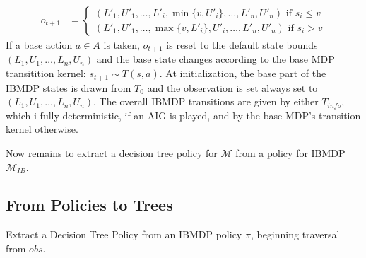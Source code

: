 \begin{definition}
\begin{itemize}
\begin{align*}
    o_{t+1} &= \begin{cases}
        (L'_1, U'_1, \dots , L'_i, \min\{v, U'_i\}, \dots , L'_n, U'_n) \text{ if } s_i \leq v\\
        (L'_1, U'_1, \dots , \max\{v, L'_i\}, U'_i, \dots , L'_n, U'_n) \text{ if } s_i > v
    \end{cases}
\end{align*}
If a base action $a\in A$ is taken, $o_{t+1}$ is reset to the default state bounds $(L_1, U_1,\dots, L_n, U_n)$ and the base state changes according to the base MDP transitition kernel: $s_{t+1}\sim T(s, a)$.
At initialization, the base part of the IBMDP states is drawn from $T_0$ and the observation is set always set to $(L_1, U_1,\dots, L_n, U_n)$.
The overall IBMDP transitions are given by either $T_{info}$, which i fully deterministic, if an AIG is played, and by the base MDP's transition kernel otherwise.
\end{itemize}
\end{definition}
Now remains to extract a decision tree policy for $\mathcal{M}$ from a policy for IBMDP $\mathcal{M}_{IB}$. 

\subsection{From Policies to Trees}
\begin{algorithm}[t]
    
    
    
    \caption{Extract a Decision Tree Policy from an IBMDP policy $\pi$, beginning traversal from $obs$.}\label{alg_extract_tree}
\end{algorithm}

